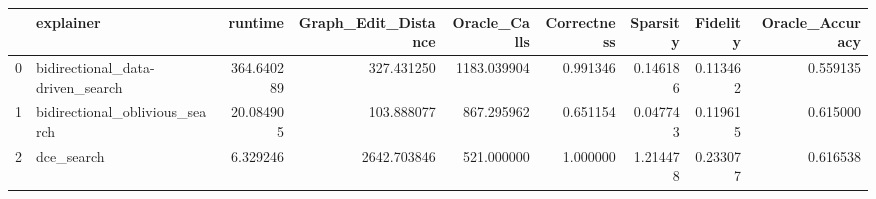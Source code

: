 \begin{tabular}{llrrrrrrr}
\toprule
{} &                         explainer &     runtime &  Graph\_Edit\_Distance &  Oracle\_Calls &  Correctness &  Sparsity &  Fidelity &  Oracle\_Accuracy \\
\midrule
0 &  bidirectional\_data-driven\_search &  364.640289 &           327.431250 &   1183.039904 &     0.991346 &  0.146186 &  0.113462 &         0.559135 \\
1 &    bidirectional\_oblivious\_search &   20.084905 &           103.888077 &    867.295962 &     0.651154 &  0.047743 &  0.119615 &         0.615000 \\
2 &                        dce\_search &    6.329246 &          2642.703846 &    521.000000 &     1.000000 &  1.214478 &  0.233077 &         0.616538 \\
\bottomrule
\end{tabular}
